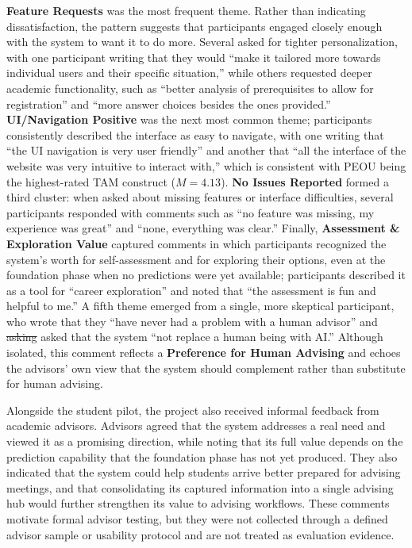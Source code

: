 \documentclass[letterpaper,11pt]{article}
\newcommand{\DIFdel}[1]{%
  \begingroup\setlength{\fboxsep}{0.5pt}%
  \colorbox{diffdelbg}{\textcolor{diffdeltext}{\sout{#1}}}%
  \endgroup}
\newcommand{\DIFadd}[1]{%
  \begingroup\setlength{\fboxsep}{0.5pt}%
  \colorbox{diffaddbg}{\textcolor{diffaddtext}{#1}}%
  \endgroup}
\begin{document}
\textbf{Feature Requests} was the most frequent theme. Rather than indicating dissatisfaction, the pattern suggests that participants engaged closely enough with the system to want it to do more. Several asked for tighter personalization, with one participant writing that they would ``make it tailored more towards individual users and their specific situation,'' while others requested deeper academic functionality, such as ``better analysis of prerequisites to allow for registration'' and ``more answer choices besides the ones provided.'' \textbf{UI/Navigation Positive} was the next most common theme; participants consistently described the interface as easy to navigate, with one writing that ``the UI navigation is very user friendly'' and another that ``all the interface of the website was very intuitive to interact with,'' which is consistent with PEOU being the highest-rated TAM construct ($M=4.13$). \textbf{No Issues Reported} formed a third cluster: when asked about missing features or interface difficulties, several participants responded with comments such as ``no feature was missing, my experience was great'' and ``none, everything was clear.'' Finally, \textbf{Assessment \& Exploration Value} captured comments in which participants recognized the system's worth for self-assessment and for exploring their options, even at the foundation phase when no predictions were yet available; participants described it as a tool for ``career exploration'' and noted that ``the assessment is fun and helpful to me.'' A fifth theme emerged from a single, more skeptical participant, who wrote that they ``have never had a problem with a human advisor'' and \DIFdel{asking} \DIFadd{asked} that the system ``not replace a human being with AI.'' Although isolated, this comment reflects a \textbf{Preference for Human Advising} and echoes the advisors' own view that the system should complement rather than substitute for human advising.

Alongside the student pilot, the project also received informal feedback from academic advisors. Advisors agreed that the system addresses a real need and viewed it as a promising direction, while noting that its full value depends on the prediction capability that the foundation phase has not yet produced. They also indicated that the system could help students arrive better prepared for advising meetings, and that consolidating its captured information into a single advising hub would further strengthen its value to advising workflows. \DIFadd{These} \DIFadd{comments} \DIFadd{motivate} \DIFadd{formal} \DIFadd{advisor} \DIFadd{testing,} \DIFadd{but} \DIFadd{they} \DIFadd{were} \DIFadd{not} \DIFadd{collected} \DIFadd{through} \DIFadd{a} \DIFadd{defined} \DIFadd{advisor} \DIFadd{sample} \DIFadd{or} \DIFadd{usability} \DIFadd{protocol} \DIFadd{and} \DIFadd{are} \DIFadd{not} \DIFadd{treated} \DIFadd{as} \DIFadd{evaluation} \DIFadd{evidence.}
\end{document}
